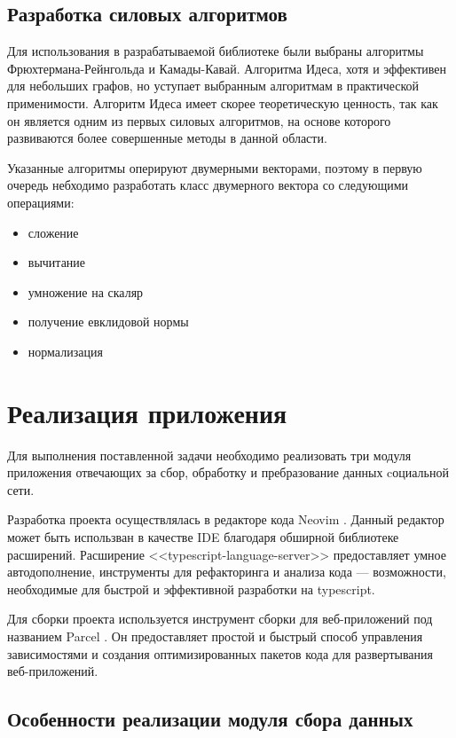 \documentclass[14pt, russian]{scrartcl}
\begin{document}
\subsection{Разработка силовых алгоритмов}

Для использования в разрабатываемой библиотеке были выбраны алгоритмы Фрюхтермана-Рейнгольда и Камады-Кавай. Алгоритма Идеса, хотя и эффективен для небольших графов, но уступает выбранным алгоритмам в практической применимости. Алгоритм Идеса имеет скорее теоретическую ценность, так как он является одним из первых силовых алгоритмов, на основе которого развиваются более совершенные методы в данной области.

Указанные алгоритмы оперируют двумерными векторами, поэтому в первую очередь небходимо разработать класс двумерного вектора со следующими операциями:

\begin{itemize}
	\item сложение
	\item вычитание
	\item умножение на скаляр
	\item получение евклидовой нормы
	\item нормализация
\end{itemize}




\section{Реализация приложения}

Для выполнения поставленной задачи необходимо реализовать три
модуля приложения отвечающих за сбор, обработку и пребразование данных cоциальной сети.

Разработка проекта осуществлялась в редакторе кода Neovim \cite{NVIM}. Данный редактор может быть использван в качестве IDE благодаря обширной библиотеке расширений.
Расширение <<typescript-language-server>> \cite{TSLSP} предоставляет умное автодополнение, инструменты для рефакторинга и анализа кода --- возможности, необходимые для быстрой и
эффективной разработки на typescript.

Для сборки проекта используется  инструмент сборки для веб-приложений под названием Parcel \cite{PARCEL}.
Он предоставляет простой и быстрый способ управления зависимостями и создания оптимизированных пакетов кода для развертывания веб-приложений.

\subsection{Особенности реализации модуля сбора данных}
\end{document}

